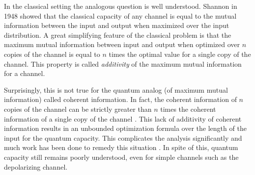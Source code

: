 \documentclass[11pt]{article}
\begin{document}
In the classical setting the analogous question is well understood. Shannon \cite{shannon} in 1948 showed that the classical capacity of any channel is equal to the mutual information between the input and output when maximized over the input distribution. A great simplifying feature of the classical problem is that the maximum mutual information between input and output when optimized over $n$ copies of the channel is equal to $n$ times the optimal value for a single copy of the channel. This property is called \emph{additivity} of the maximum mutual information for a channel.

Surprisingly, this is not true for the quantum analog (of maximum mutual information) called coherent information. In fact, the coherent information of $n$ copies of the channel can be strictly greater than $n$ times the coherent information of a single copy of the channel \cite{bennett1996mixed,divincenzo1998quantum,shor1996quantumerrorcorrectingcodesneed}. 
This lack of additivity of coherent information results in an unbounded optimization formula over the length of the input for the quantum capacity. This complicates the analysis significantly and much work has been done to remedy this situation \cite{Schumacher96,SchumacherNielsen96,lloyd1997capacity,cerf1998quantum,PhysRevA.57.4153,850671,smith2007degenerate,smith2008quantum,gsquantum, smith2011quantum, brandao2012does, cubitt2015unbounded, jackson2017degenerate, leditzky2018dephrasure, bausch2020quantum, bausch2021error, leditzky2023generic, agarwal2026error}. In spite of this, quantum capacity still remains poorly understood, even for simple channels such as the depolarizing channel. 
\end{document}
